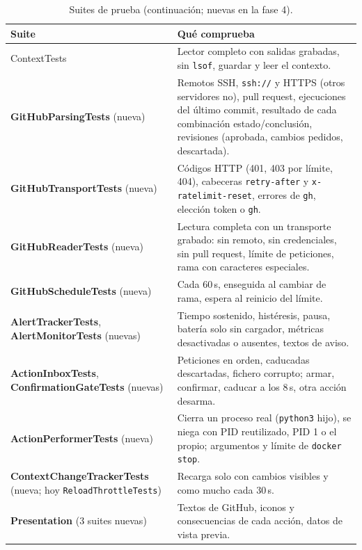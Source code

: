 \documentclass[11pt,a4paper]{article}
\begin{document}
\begin{table}[H]
\centering
\begin{tabularx}{\textwidth}{@{}lX@{}}
\toprule
\textbf{Suite} & \textbf{Qué comprueba}\\
\midrule
ContextTests & Lector completo con salidas grabadas,
sin \texttt{lsof}, guardar y leer el contexto.\\
\textbf{GitHubParsingTests} (nueva) & Remotos SSH, \texttt{ssh://} y
HTTPS (otros servidores no), pull request, ejecuciones del último
commit, resultado de cada combinación estado/conclusión, revisiones
(aprobada, cambios pedidos, descartada).\\
\textbf{GitHubTransportTests} (nueva) & Códigos HTTP (401, 403 por
límite, 404), cabeceras \texttt{retry-after} y
\texttt{x-ratelimit-reset}, errores de \texttt{gh}, elección token
o \texttt{gh}.\\
\textbf{GitHubReaderTests} (nueva) & Lectura completa con un
transporte grabado: sin remoto, sin credenciales, sin pull request,
límite de peticiones, rama con caracteres especiales.\\
\textbf{GitHubScheduleTests} (nueva) & Cada 60\,s, enseguida al
cambiar de rama, espera al reinicio del límite.\\
\textbf{AlertTrackerTests}, \textbf{AlertMonitorTests} (nuevas) &
Tiempo sostenido, histéresis, pausa, batería solo sin cargador,
métricas desactivadas o ausentes, textos de aviso.\\
\textbf{ActionInboxTests}, \textbf{ConfirmationGateTests} (nuevas) &
Peticiones en orden, caducadas descartadas, fichero corrupto; armar,
confirmar, caducar a los 8\,s, otra acción desarma.\\
\textbf{ActionPerformerTests} (nueva) & Cierra un proceso real
(\texttt{python3} hijo), se niega con PID reutilizado, PID 1 o el
propio; argumentos y límite de \texttt{docker stop}.\\
\textbf{ContextChangeTrackerTests} (nueva; hoy
\texttt{ReloadThrottleTests}) & Recarga solo con cambios
visibles y como mucho cada 30\,s.\\
\textbf{Presentation} (3 suites nuevas) & Textos de GitHub, iconos y
consecuencias de cada acción, datos de vista previa.\\
\bottomrule
\end{tabularx}
\caption{Suites de prueba (continuación; nuevas en la fase 4).}
\end{table}
\end{document}
